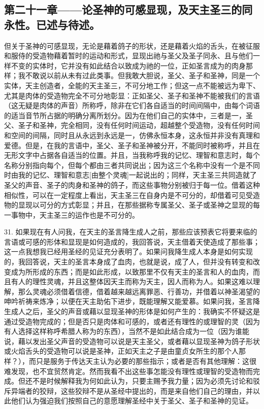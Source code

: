 
\subsection{第二十一章——论圣神的可感显现，及天主圣三的同永性。已述与待述。}

但关于圣神的可感显现，无论是藉着鸽子的形状，还是藉着火焰的舌头，在被征服和服侍的受造物藉着暂时的运动和形式，显现出祂与圣父及圣子同永、且与他们一样不变的实体时，它并没有如此结合以致成为祂的一位，正如圣言成为的肉身那样；我不敢说以前从未有过此类事。但我敢大胆说，圣父、圣子和圣神，同是一个实体，天主创造者，全能的天主圣三，不可分地工作；但这一点不能被远为卑下、尤其是肉体的受造物完全不可分地彰显：正如圣父、圣子和圣神不能被我们的言语（这无疑是肉体的声音）所称呼，除非在它们各自适当的时间间隔中，由每个词语的适当音节所占据的明确分离所划分。因为在他们自己的实体中，三者是一，圣父、圣子和圣神，完全相同，没有任何时间运动，超越整个受造物，没有任何时间和空间的间隔，同时且从永远到永远是一，仿佛永恒本身，这永恒并非没有真理和爱德。但是，在我的言语中，圣父、圣子和圣神被分开，不能同时被称呼，并且在无形文字中占据各自适当的位置。并且，当我称呼我的记忆、理智和意志时，每个名称分别指向每个，但每个都由三者共同说出；因为这三个名称中没有一个是不同时由我的记忆、理智和意志[由整个灵魂]一起说出的；同样，天主圣三共同造就了圣父的声音、圣子的肉身和圣神的鸽子，而这些事物分别被归于每一位。借着这种相似性，可以在一定程度上看出，天主圣三在自身内是不可分的，却借着可见受造物的显现以可分的方式彰显；并且，在那些据称专属圣父、圣子或圣神之显现的每一事物中，天主圣三的运作也是不可分的。\par

31. 如果现在有人问我，在天主的圣言降生成人之前，那些应该预表它将要来临的言语或可感的形体和显现是如何造成的，我回答说，天主借着天使造成了那些事；这一点我想我已经用圣经的见证充分表明了。如果问我降生成人本身是如何实现的，我回答说，天主的圣言本身成了血肉，也就是说，成了人，但并没有转变和改变成为所形成的东西；而是如此形成，以致那里不仅有天主的圣言和人的血肉，而且有人的理性灵魂，并且这整体因天主而称为天主，因人而称为人。如果这难以理解，那么灵魂必须借着信德，借着越来越远离罪恶、行善功，并借着以神圣渴望的呻吟祈祷来炼净；以便在天主助佑下进步，既能理解又能爱慕。如果问我，圣言降生成人之后，圣父的声音或藉以显现圣神的形体是如何产生的：我确实不怀疑这是通过受造物完成的；但是否只是肉体和可感的，或者还有理性的或理智的灵（因为有人选择这样称呼希腊人称为的东西），当然不是如此结合成为一位（因为谁能说，藉以发出圣父声音的受造物可以说是天主圣父，或者藉以显现圣神为鸽子形状或火焰舌头的受造物可以说是圣神，正如天主之子是由童贞女所生的那个人那样？），而只是服务于传达天主认为必要的那些指示；或者是否有其他理解：这很难发现，也不宜贸然肯定。然而我看不出这些事怎能没有理性或理智的受造物而完成。但还不是时候解释我为何如此认为，只要主赐予我力量；因为必须先讨论和驳斥异端者的狡辩，这些狡辩不是从圣经中提出的，而是来自他们自己的理由，并以此他们认为强迫我们按照自己的意愿理解圣经中关于圣父、圣子和圣神的见证。\par

